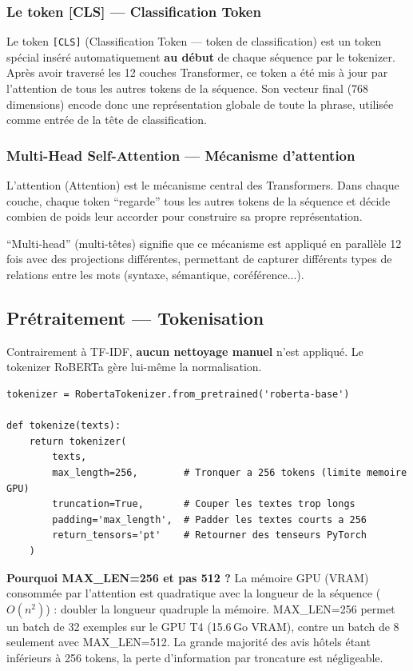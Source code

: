 \documentclass[12pt, a4paper]{article}
\begin{document}
\subsubsection{Le token [CLS] — Classification Token}

Le token \texttt{[CLS]} (Classification Token — token de classification) est un token
spécial inséré automatiquement \textbf{au début} de chaque séquence par le tokenizer.
Après avoir traversé les 12 couches Transformer, ce token a été mis à jour par
l'attention de tous les autres tokens de la séquence. Son vecteur final (768 dimensions)
encode donc une représentation globale de toute la phrase, utilisée comme entrée
de la tête de classification.

\subsubsection{Multi-Head Self-Attention — Mécanisme d'attention}

L'attention (Attention) est le mécanisme central des Transformers. Dans chaque couche,
chaque token ``regarde'' tous les autres tokens de la séquence et décide combien
de poids leur accorder pour construire sa propre représentation.

``Multi-head'' (multi-têtes) signifie que ce mécanisme est appliqué en parallèle
12 fois avec des projections différentes, permettant de capturer différents types
de relations entre les mots (syntaxe, sémantique, coréférence...).

\subsection{Prétraitement — Tokenisation}

Contrairement à TF-IDF, \textbf{aucun nettoyage manuel} n'est appliqué.
Le tokenizer RoBERTa gère lui-même la normalisation.

\begin{lstlisting}[caption={Tokenisation pour RoBERTa}]
tokenizer = RobertaTokenizer.from_pretrained('roberta-base')

def tokenize(texts):
    return tokenizer(
        texts,
        max_length=256,        # Tronquer a 256 tokens (limite memoire GPU)
        truncation=True,       # Couper les textes trop longs
        padding='max_length',  # Padder les textes courts a 256
        return_tensors='pt'    # Retourner des tenseurs PyTorch
    )
\end{lstlisting}

\textbf{Pourquoi MAX\_LEN=256 et pas 512 ?}
La mémoire GPU (VRAM) consommée par l'attention est quadratique avec la longueur
de la séquence ($O(n^2)$) : doubler la longueur quadruple la mémoire.
MAX\_LEN=256 permet un batch de 32 exemples sur le GPU T4 (15.6\,Go VRAM),
contre un batch de 8 seulement avec MAX\_LEN=512.
La grande majorité des avis hôtels étant inférieurs à 256 tokens, la perte
d'information par troncature est négligeable.
\end{document}
